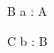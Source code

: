 \begin{zed}
	[A]
\end{zed}

\begin{schema}{B}
	a : \power A
\end{schema}

\begin{schema}{C}
	b : \power B
\end{schema}